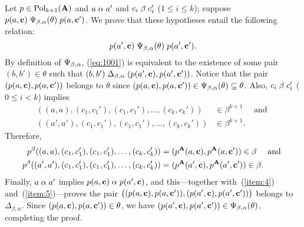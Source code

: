     Let $p \in \operatorname{Pol}_{k+1}(\mathbf{A})$ and $a \mathrel{\alpha} a'$ and $c_i \mathrel{\beta} c_i'$ ($1\leq i\leq k$);
    suppose $p(a, \mathbf{c}) \mathrel{\Psi_{\beta, \alpha}(\theta)} p(a, \mathbf{c}')$.
    We prove that these hypotheses entail the following relation:
    \begin{equation}
      \label{eq:1001}
      p(a', \mathbf{c}) \mathrel{\Psi_{\beta, \alpha}(\theta)} p(a', \mathbf{c}').
    \end{equation}
    By definition of $\Psi_{\beta, \alpha}$, (\ref{eq:1001}) 
    is equivalent to the existence of
    some pair $(b,b') \in \theta$ such that
    $(b,b') \mathrel{\Delta_{\beta, \alpha}} (p(a', \mathbf{c}), p(a', \mathbf{c}'))$.
    Notice that the pair $(p(a, \mathbf{c}), p(a, \mathbf{c}'))$
    belongs to $\theta$ since
    $(p(a, \mathbf{c}), p(a, \mathbf{c}')) \in \Psi_{\beta, \alpha}(\theta) \subseteq \theta$.  Also,
    $c_i \mathrel{\beta} c_i'$ ($0\leq i<k$) implies
    \begin{align*}
    ((a,a), (c_1, c_1'), (c_1, c_1'), \dots, (c_{k}, c_{k}'))&\in \beta^{k+1} \quad \text{ and }\\
    ((a',a'), (c_1, c_1'), (c_1, c_1'), \dots, (c_{k}, c_{k}')) &\in \beta^{k+1}.
    \end{align*}
    Therefore,
    \begin{align}
      \label{item:4}
    p^{\beta}((a,a), (c_1, c_1'), (c_1, c_1'), \dots, (c_{k}, c_{k}'))
    &= (p^{\mathbf{A}}(a, \mathbf{c}), p^{\mathbf{A}}(a, \mathbf{c}')) \in \beta  \quad \text{ and }\\
    \label{item:5}
    p^{\beta}((a',a'), (c_1, c_1'), (c_1, c_1'), \dots, (c_{k}, c_{k}'))
    &= (p^{\mathbf{A}}(a', \mathbf{c}), p^{\mathbf{A}}(a', \mathbf{c}')) \in \beta.
    \end{align}
    Finally, $a\mathrel{\alpha} a'$ implies $p(a, \mathbf{c}) \mathrel{\alpha} p(a', \mathbf{c})$, and this---together
    with~(\ref{item:4}) and~(\ref{item:5})---proves the pair
    $\bigl((p(a, \mathbf{c}), p(a, \mathbf{c}')), (p(a', \mathbf{c}), p(a', \mathbf{c}'))\bigr)$
    belongs to  $\mathrel{\Delta_{\beta, \alpha}}$.
    Since  $(p(a, \mathbf{c}), p(a, \mathbf{c}')) \in \theta$, we have
    $(p(a', \mathbf{c}), p(a', \mathbf{c}')) \in \Psi_{\beta, \alpha}(\theta)$, completing the proof.







